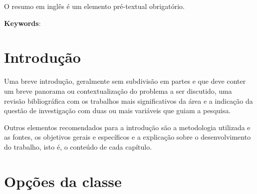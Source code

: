 \documentclass[rec]{fearp}
\begin{document}
\begin{resumo}[Abstract]

O resumo em inglês é um elemento pré-textual obrigatório. 

\vspace*{\onelineskip}
\noindent
\textbf{Keywords}: \\
\jel{} 
\end{resumo}





\phantom{x}
\tableofcontents*
\cleardoublepage

\mainmatter 
\pagestyle{meuestilo}

 
\chapter*{Introdução}

Uma breve introdução, geralmente sem subdivisão em partes e que deve conter um breve panorama ou contextualização do problema a ser discutido, uma revisão bibliográfica com os trabalhos mais significativos da área e a indicação da questão de investigação com duas ou mais variáveis que guiam a pesquisa. 

Outros elementos recomendados para a introdução são a metodologia utilizada e as fontes, os objetivos gerais e específicos e a explicação sobre o desenvolvimento do trabalho, isto é, o conteúdo de cada capítulo.


\chapter{Opções da classe}
\end{document}
